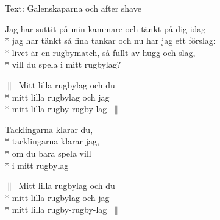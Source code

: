 \begin{SongText}
\begin{SongInfo}
    Text: Galenskaparna och after shave
\end{SongInfo}
\begin{SongVerse}
Jag har suttit på min kammare och tänkt på dig idag\\*%
jag har tänkt så fina tankar och nu har jag ett förslag:\\*%
livet är en rugbymatch, så fullt av hugg och slag,\\*%
vill du spela i mitt rugbylag?
\end{SongVerse}
\begin{SongVerse}
$\|\:$ Mitt lilla rugbylag och du\\*%
mitt lilla rugbylag och jag\\*%
mitt lilla rugby-rugby-lag $\:\|$
\end{SongVerse}
\begin{SongVerse}
Tacklingarna klarar du,\\*%
tacklingarna klarar jag,\\*%
om du bara spela vill\\*%
i mitt rugbylag
\end{SongVerse}
\begin{SongVerse}
$\|\:$ Mitt lilla rugbylag och du\\*%
mitt lilla rugbylag och jag\\*%
mitt lilla rugby-rugby-lag $\:\|$
\end{SongVerse}
\end{SongText}
